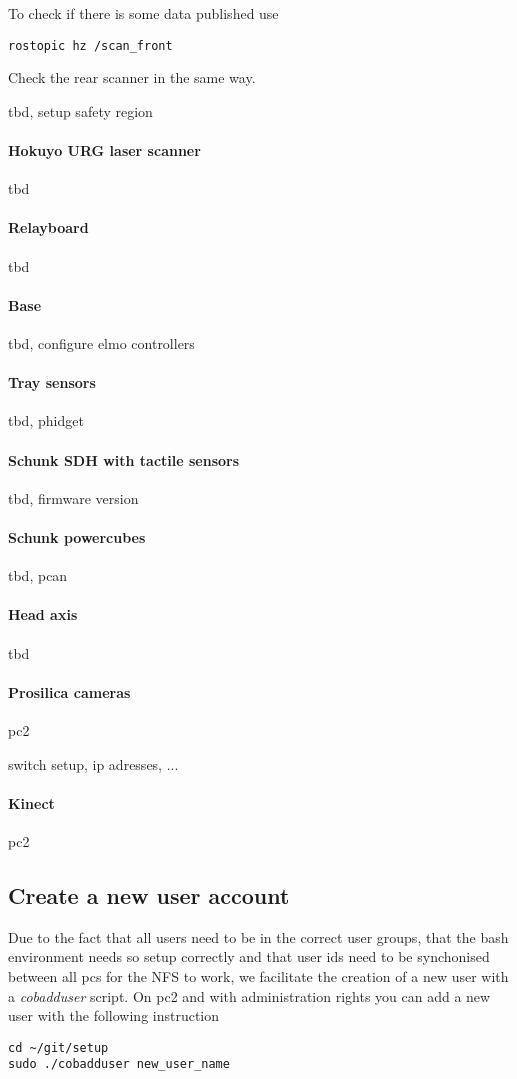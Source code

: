 To check if there is some data published use
\begin{lstlisting}
rostopic hz /scan_front
\end{lstlisting}

Check the rear scanner in the same way.

tbd, setup safety region

\paragraph{Hokuyo URG laser scanner}
tbd

\paragraph{Relayboard}
tbd

\paragraph{Base}
tbd, configure elmo controllers

\paragraph{Tray sensors}
tbd, phidget

\paragraph{Schunk SDH with tactile sensors}
tbd, firmware version

\paragraph{Schunk powercubes}
tbd, pcan

\paragraph{Head axis}
tbd

\paragraph{Prosilica cameras}
pc2

switch setup, ip adresses, ...

\paragraph{Kinect}
pc2


\subsection{Create a new user account}
Due to the fact that all users need to be in the correct user groups, that the bash environment needs so setup correctly and that user ids need to be synchonised between all pcs for the NFS to work, we facilitate the creation of a new user with a \textit{cobadduser} script. On pc2 and with administration rights you can add a new user with the following instruction
\begin{lstlisting}
cd ~/git/setup
sudo ./cobadduser new_user_name
\end{lstlisting}

